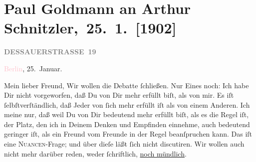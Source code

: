 

\renewcommand{\erwaehntePersonen}{Personen: Richard Beer-Hofmann, Emerich von Bukovics, Theodor Herzl, Heinrich Kanner, Fedor Mamroth, Olga Schnitzler, Émile Zola}
\renewcommand{\erwaehnteInstitutionen}{Institutionen: Burgtheater, Deutsches Theater Berlin, Die Zeit, Volkstheater}
\renewcommand{\erwaehnteOrte}{Orte: Berlin, Dessauer Straße, Frankfurt am Main, Frankreich, Rodaun, Wien}
\renewcommand{\erwaehnteWerke}{Werke: Berliner Theater. (»Lebendige Stunden« von Arthur Schnitzler.), Der Schleier der Beatrice. Schauspiel in fünf Akten, Lebendige Stunden. Vier Einakter, Neue Freie Presse, Tagebuch}
\section[ Paul Goldmann an Arthur Schnitzler, 25. 1. {[}1902{]}]{Paul Goldmann an Arthur Schnitzler, 25. 1. {[}1902{]}}
\nopagebreak{}
\rehead{ }\normalsize\beginnumbering{}
\toendnotes[C]{\smallbreak\pagebreak[2]}
\toendnotes[C]{\smallbreak}
\pstart
           \noindent{}\raggedleft{}{\pb}\textcolor{pink}{\textcolor{gray}{\textbf{DESSAUERSTRASSE 19}}}{}\ledrightnote{\textcolor{pink}{Dessauer Straße}}\pend
           
\pstart
           \textcolor{pink}{Berlin}{}\ledrightnote{\textcolor{pink}{Berlin}}, 25. Januar.\pend
           
\pstart\center{}Mein lieber Freund,\pend
\pstart
           Wir wollen die Debatte ſchließen. Nur Eines noch: Ich habe Dir nicht vorgeworfen, daß
               Du von Dir mehr erfüllt biſt, als von mir. Es iſt ſelbſtverſtändlich, daß Jeder von
               ſich mehr erfüllt iſt als von einem Anderen. Ich meine nur, daß \strikeout{\textcolor{gray}{ich in Deinen}} weil Du von Dir bedeutend mehr erfüllt biſt, als es die Regel iſt, der Platz,
               den ich in Deinem Denken und Empfinden einnehme, auch bedeutend geringer iſt, als ein
               Freund vom Freunde in der Regel beanſpruchen kann. Das iſt eine \textsc{Nuancen}-Frage; und über dieſe läßt ſich nicht discutiren. Wir wollen auch
               nicht mehr darüber reden, weder ſchriftlich, \uline{noch
                  mündlich}.\pend
           
